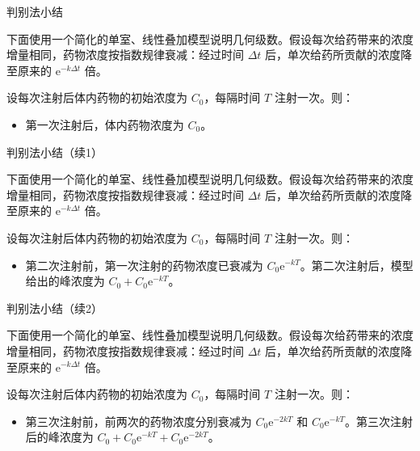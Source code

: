 \documentclass[aspectratio=169,10pt,fontset=fandol]{ctexbeamer}
\newcommand{\ee}{\mathrm{e}}
\begin{document}
\begin{frame}[t,fragile]{判别法小结}
\footnotesize
{\footnotesize
\begin{application}

下面使用一个简化的单室、线性叠加模型说明几何级数。假设每次给药带来的浓度增量相同，药物浓度按指数规律衰减：经过时间 \(\Delta t\) 后，单次给药所贡献的浓度降至原来的 \(\ee^{-k\Delta t}\) 倍。

设每次注射后体内药物的初始浓度为 \(C_0\)，每隔时间 \(T\) 注射一次。则：
\begin{itemize}
\item 第一次注射后，体内药物浓度为 \(C_0\)。

\end{itemize}\end{application}
}
\end{frame}
\begin{frame}[t,fragile]{判别法小结（续1）}
\footnotesize
{\footnotesize
\begin{application}

下面使用一个简化的单室、线性叠加模型说明几何级数。假设每次给药带来的浓度增量相同，药物浓度按指数规律衰减：经过时间 \(\Delta t\) 后，单次给药所贡献的浓度降至原来的 \(\ee^{-k\Delta t}\) 倍。

设每次注射后体内药物的初始浓度为 \(C_0\)，每隔时间 \(T\) 注射一次。则：
\begin{itemize}

\item 第二次注射前，第一次注射的药物浓度已衰减为 \(C_0\ee^{-kT}\)。第二次注射后，模型给出的峰浓度为 \(C_0+C_0\ee^{-kT}\)。

\end{itemize}\end{application}
}
\end{frame}
\begin{frame}[t,fragile]{判别法小结（续2）}
\footnotesize
{\footnotesize
\begin{application}

下面使用一个简化的单室、线性叠加模型说明几何级数。假设每次给药带来的浓度增量相同，药物浓度按指数规律衰减：经过时间 \(\Delta t\) 后，单次给药所贡献的浓度降至原来的 \(\ee^{-k\Delta t}\) 倍。

设每次注射后体内药物的初始浓度为 \(C_0\)，每隔时间 \(T\) 注射一次。则：
\begin{itemize}

\item 第三次注射前，前两次的药物浓度分别衰减为 \(C_0\ee^{-2kT}\) 和 \(C_0\ee^{-kT}\)。第三次注射后的峰浓度为 \(C_0+C_0\ee^{-kT}+C_0\ee^{-2kT}\)。

\end{itemize}\end{application}
}
\end{frame}
\end{document}
